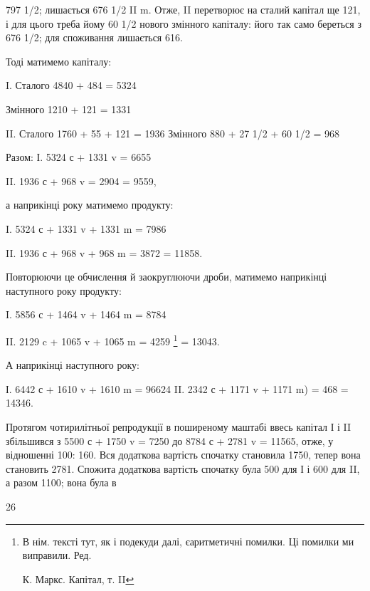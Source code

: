 \parcont{}  %
797 1/2; лишається 676 1/2 II m. Отже, II перетворює на сталий капітал
ще 121, і для цього треба йому 60 1/2 нового змінного капіталу: його
так само береться з 676 1/2; для споживання лишається 616.

Тоді матимемо капіталу:

I. Сталого 4840 + 484 = 5324

Змінного 1210 + 121 = 1331

II. Сталого 1760 + 55 + 121 = 1936
Змінного 880 + 27 1/2 + 60 1/2 = 968

Разом: І. 5324 с + 1331 v = 6655

II. 1936 с + 968 v = 2904
= 9559,

а наприкінці року матимемо продукту:

I.    5324 с + 1331 v + 1331 m = 7986

II.    1936 с + 968 v + 968 m = 3872
= 11858.

Повторюючи це обчислення й заокруглюючи дроби, матимемо наприкінці
наступного року продукту:

I.    5856 с + 1464 v + 1464 m = 8784

II.    2129 c + 1065 v + 1065 m = 4259 \footnote*{
В нім. тексті тут, як і подекуди далі, єаритметичні помилки. Ці помилки ми
виправили. Ред.

К. Маркс. Капітал, т. II
}
= 13043.

А наприкінці наступного року:

І. 6442 с + 1610 v + 1610 m = 96624
II. 2342 с + 1171 v + 1171 m) = 468
= 14346.

Протягом чотирилітньої репродукції в поширеному маштабі ввесь
капітал І і II збільшився з 5500 с + 1750 v = 7250 до 8784 с + 2781 v =
11565, отже, у відношенні 100: 160. Вся додаткова вартість спочатку
становила 1750, тепер вона становить 2781. Спожита додаткова вартість
спочатку була 500 для І і 600 для II, а разом 1100; вона була в

26
\parbreak{}  %
